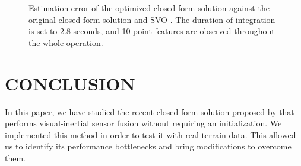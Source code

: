 \documentclass[letterpaper, 10 pt, conference]{ieeeconf}  %
\begin{document}
\begin{figure}
   \centering
   \resizebox{0.7\columnwidth}{!}{}
   \caption{Estimation error of the optimized closed-form solution against the original closed-form solution \cite{Martinelli2014} and SVO \cite{Forster2014}. The duration of integration is set to 2.8 seconds, and 10 point features are observed throughout the whole operation.}
\end{figure}






\section{CONCLUSION}


In this paper, we have studied the recent closed-form solution proposed by \cite{Martinelli2014} that performs visual-inertial sensor fusion without requiring an initialization.
We implemented this method in order to test it with real terrain data.
This allowed us to identify its performance bottlenecks and bring modifications to overcome them.
\end{document}
